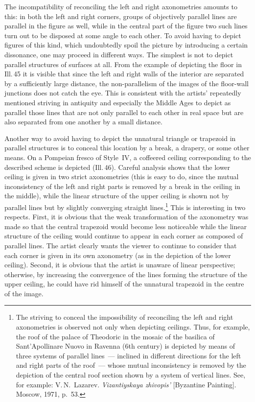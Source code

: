 The incompatibility of reconciling the left and right axonometries amounts to this:
in both the left and right corners, groups of objectively parallel lines are parallel
in the figure as well, while in the central part of the figure two such lines turn
out to be disposed at some angle to each other.  To avoid having to depict figures of
this kind, which undoubtedly spoil the picture by introducing a certain dissonance,
one may proceed in different ways.  The simplest is not to depict parallel structures
of surfaces at all.  From the example of depicting the floor in Ill.\,45 it is
visible that since the left and right walls of the interior are separated by a
sufficiently large distance, the non-parallelism of the images of the floor-wall
junctions does not catch the eye.  This is consistent with the artists' repeatedly
mentioned striving in antiquity and especially the Middle Ages to depict as parallel
those lines that are not only parallel to each other in real space but are also
separated from one another by a small distance.

Another way to avoid having to depict the unnatural triangle or trapezoid in parallel
structures is to conceal this location by a break, a drapery, or some other means.
On a Pompeian fresco of Style~IV, a coffeered ceiling corresponding to the described
scheme is depicted (Ill.\,46).  Careful analysis shows that the lower ceiling is
given in two strict axonometries (this is easy to do, since the mutual inconsistency
of the left and right parts is removed by a break in the ceiling in the middle), while
the linear structure of the upper ceiling is shown not by parallel lines but by
slightly converging straight lines.\footnote{The striving to conceal the impossibility
  of reconciling the left and right axonometries is observed not only when depicting
  ceilings.  Thus, for example, the roof of the palace of Theodoric in the mosaic of
  the basilica of Sant'Apollinare Nuovo in Ravenna (6th century) is depicted by means
  of three systems of parallel lines~--- inclined in different directions for the left
  and right parts of the roof~--- whose mutual inconsistency is removed by the
  depiction of the central roof section shown by a system of vertical lines.  See, for
  example: V.\,N.~Lazarev.  \emph{Vizantiyskaya zhivopis'} [Byzantine Painting].
  Moscow, 1971, p.~53.}
This is interesting in two respects.  First, it is obvious that the weak
transformation of the axonometry was made so that the central trapezoid would become
less noticeable while the linear structure of the ceiling would continue to appear in
each corner as composed of parallel lines.  The artist clearly wants the viewer to
continue to consider that each corner is given in its own axonometry (as in the
depiction of the lower ceiling).  Second, it is obvious that the artist is unaware of
linear perspective; otherwise, by increasing the convergence of the lines forming the
structure of the upper ceiling, he could have rid himself of the unnatural trapezoid
in the centre of the image.

